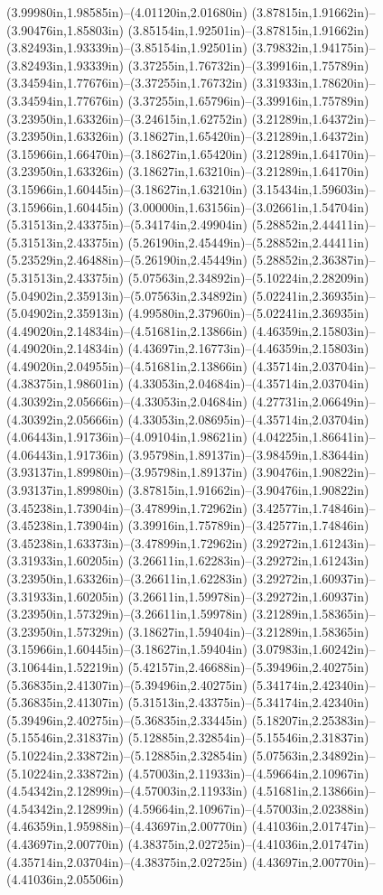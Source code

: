 (3.99980in,1.98585in)--(4.01120in,2.01680in) (3.87815in,1.91662in)--(3.90476in,1.85803in) (3.85154in,1.92501in)--(3.87815in,1.91662in) (3.82493in,1.93339in)--(3.85154in,1.92501in) (3.79832in,1.94175in)--(3.82493in,1.93339in) (3.37255in,1.76732in)--(3.39916in,1.75789in) (3.34594in,1.77676in)--(3.37255in,1.76732in) (3.31933in,1.78620in)--(3.34594in,1.77676in) (3.37255in,1.65796in)--(3.39916in,1.75789in) (3.23950in,1.63326in)--(3.24615in,1.62752in) (3.21289in,1.64372in)--(3.23950in,1.63326in) (3.18627in,1.65420in)--(3.21289in,1.64372in) (3.15966in,1.66470in)--(3.18627in,1.65420in) (3.21289in,1.64170in)--(3.23950in,1.63326in) (3.18627in,1.63210in)--(3.21289in,1.64170in) (3.15966in,1.60445in)--(3.18627in,1.63210in) (3.15434in,1.59603in)--(3.15966in,1.60445in) (3.00000in,1.63156in)--(3.02661in,1.54704in) (5.31513in,2.43375in)--(5.34174in,2.49904in) (5.28852in,2.44411in)--(5.31513in,2.43375in) (5.26190in,2.45449in)--(5.28852in,2.44411in) (5.23529in,2.46488in)--(5.26190in,2.45449in) (5.28852in,2.36387in)--(5.31513in,2.43375in) (5.07563in,2.34892in)--(5.10224in,2.28209in) (5.04902in,2.35913in)--(5.07563in,2.34892in) (5.02241in,2.36935in)--(5.04902in,2.35913in) (4.99580in,2.37960in)--(5.02241in,2.36935in) (4.49020in,2.14834in)--(4.51681in,2.13866in) (4.46359in,2.15803in)--(4.49020in,2.14834in) (4.43697in,2.16773in)--(4.46359in,2.15803in) (4.49020in,2.04955in)--(4.51681in,2.13866in) (4.35714in,2.03704in)--(4.38375in,1.98601in) (4.33053in,2.04684in)--(4.35714in,2.03704in) (4.30392in,2.05666in)--(4.33053in,2.04684in) (4.27731in,2.06649in)--(4.30392in,2.05666in) (4.33053in,2.08695in)--(4.35714in,2.03704in) (4.06443in,1.91736in)--(4.09104in,1.98621in) (4.04225in,1.86641in)--(4.06443in,1.91736in) (3.95798in,1.89137in)--(3.98459in,1.83644in) (3.93137in,1.89980in)--(3.95798in,1.89137in) (3.90476in,1.90822in)--(3.93137in,1.89980in) (3.87815in,1.91662in)--(3.90476in,1.90822in) (3.45238in,1.73904in)--(3.47899in,1.72962in) (3.42577in,1.74846in)--(3.45238in,1.73904in) (3.39916in,1.75789in)--(3.42577in,1.74846in) (3.45238in,1.63373in)--(3.47899in,1.72962in) (3.29272in,1.61243in)--(3.31933in,1.60205in) (3.26611in,1.62283in)--(3.29272in,1.61243in) (3.23950in,1.63326in)--(3.26611in,1.62283in) (3.29272in,1.60937in)--(3.31933in,1.60205in) (3.26611in,1.59978in)--(3.29272in,1.60937in) (3.23950in,1.57329in)--(3.26611in,1.59978in) (3.21289in,1.58365in)--(3.23950in,1.57329in) (3.18627in,1.59404in)--(3.21289in,1.58365in) (3.15966in,1.60445in)--(3.18627in,1.59404in) (3.07983in,1.60242in)--(3.10644in,1.52219in) (5.42157in,2.46688in)--(5.39496in,2.40275in) (5.36835in,2.41307in)--(5.39496in,2.40275in) (5.34174in,2.42340in)--(5.36835in,2.41307in) (5.31513in,2.43375in)--(5.34174in,2.42340in) (5.39496in,2.40275in)--(5.36835in,2.33445in) (5.18207in,2.25383in)--(5.15546in,2.31837in) (5.12885in,2.32854in)--(5.15546in,2.31837in) (5.10224in,2.33872in)--(5.12885in,2.32854in) (5.07563in,2.34892in)--(5.10224in,2.33872in) (4.57003in,2.11933in)--(4.59664in,2.10967in) (4.54342in,2.12899in)--(4.57003in,2.11933in) (4.51681in,2.13866in)--(4.54342in,2.12899in) (4.59664in,2.10967in)--(4.57003in,2.02388in) (4.46359in,1.95988in)--(4.43697in,2.00770in) (4.41036in,2.01747in)--(4.43697in,2.00770in) (4.38375in,2.02725in)--(4.41036in,2.01747in) (4.35714in,2.03704in)--(4.38375in,2.02725in) (4.43697in,2.00770in)--(4.41036in,2.05506in) 